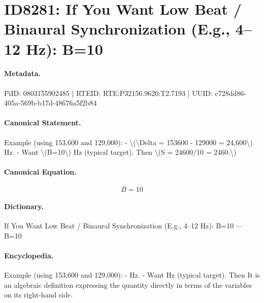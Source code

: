 \section*{ID8281: If You Want Low Beat / Binaural Synchronization (E.g., 4–12 Hz): B=10}
\paragraph{Metadata.}
PiID: 0803155902485 | RTEID: RTE:P32156.9620:T2.7193 | UUID: c728dd86-405a-569b-b17d-48676a5f2b84

\paragraph{Canonical Statement.}
Example (using 153,600 and 129,000): - \textbackslash{}(\textbackslash{}Delta = 153600 - 129000 = 24,600\textbackslash{}) Hz. - Want \textbackslash{}(B=10\textbackslash{}) Hz (typical target). Then \textbackslash{}(S = 24600/10 = 2460.\textbackslash{})

\paragraph{Canonical Equation.}
\[
B=10
\]

\paragraph{Dictionary.}
If You Want Low Beat / Binaural Synchronization (E.g., 4–12 Hz): B=10 — B=10

\paragraph{Encyclopedia.}
Example (using 153,600 and 129,000): - Hz. - Want Hz (typical target). Then It is an algebraic definition expressing the quantity directly in terms of the variables on its right-hand side.

